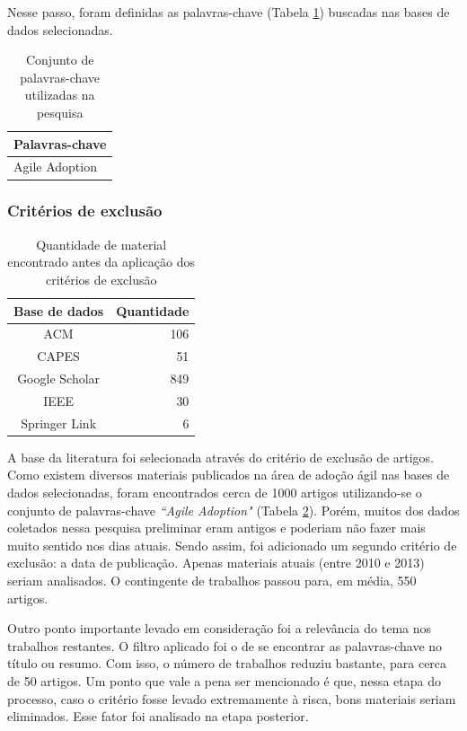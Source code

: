 Nesse passo, foram definidas as palavras-chave (Tabela \ref{tab:palavrasChave}) buscadas nas bases de dados selecionadas.

\begin{table}[H]
	\centering
	\begin{tabular}{| l |} \hline \textbf{Palavras-chave} \\ \hline
		Agile Adoption \\ \hline
	\end{tabular}
	\caption{Conjunto de palavras-chave utilizadas na pesquisa}
	\label{tab:palavrasChave}
\end{table}

\subsubsection{Critérios de exclusão}

\begin{table}[H]
	\centering
	\begin{tabular}{| c | r |} \hline \textbf{Base de dados}  & \textbf{Quantidade} \\ \hline
		ACM & 106 \\ \hline
		CAPES & 51 \\ \hline
		Google Scholar & 849 \\ \hline
		IEEE & 30 \\ \hline
		Springer Link & 6 \\
		\hline
	\end{tabular}
	\captionsetup{justification=centering}
	\caption{Quantidade de material encontrado antes da aplicação dos critérios de exclusão}
	\label{tab:quantidadeDeMateriaisAntes}
\end{table}

A base da literatura foi selecionada através do critério de exclusão de artigos. Como existem diversos materiais publicados na área de adoção ágil nas bases de dados selecionadas, foram encontrados cerca de 1000 artigos utilizando-se o conjunto de palavras-chave \textit{``Agile Adoption"} (Tabela \ref{tab:quantidadeDeMateriaisAntes}). Porém, muitos dos dados coletados nessa pesquisa preliminar eram antigos e poderiam não fazer mais muito sentido nos dias atuais. Sendo assim, foi adicionado um segundo critério de exclusão: a data de publicação. Apenas materiais atuais (entre 2010 e 2013) seriam analisados. O contingente de trabalhos passou para, em média, 550 artigos.

Outro ponto importante levado em consideração foi a relevância do tema nos trabalhos restantes. O filtro aplicado foi o de se encontrar as palavras-chave no título ou resumo. Com isso, o número de trabalhos reduziu bastante, para cerca de 50 artigos. Um ponto que vale a pena ser mencionado é que, nessa etapa do processo, caso o critério fosse levado extremamente à risca, bons materiais seriam eliminados. Esse fator foi analisado na etapa posterior.

